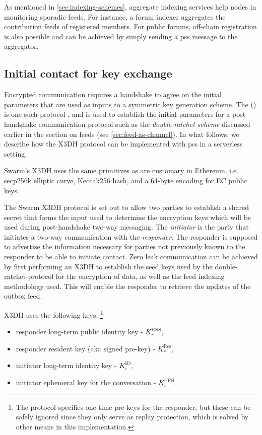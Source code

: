 As mentioned in \ref{sec:indexing-schemes}, aggregate indexing services help nodes in monitoring sporadic feeds. For instance, a forum indexer aggregates the contribution feeds of registered members. For public forums, off-chain registration is also possible and can be achieved by simply sending a pss message to the aggregator. 


\subsection{Initial contact for key exchange\statusgreen}\label{sec:pss-key-exchange}


Encrypted communication requires a handshake to agree on the initial parameters that are used as inputs to a symmetric key generation scheme. The  () is one such protocol \cite{marlinspike2016x3dh}, and is used to establish the initial parameters for a post-handshake communication protocol such as the \emph{double-ratchet scheme} discussed earlier in the section on feeds (see \ref{sec:feed-as-channel}). 
In what follows, we describe how the X3DH protocol can be implemented with pss in a serverless setting. 

Swarm's X3DH uses the same primitives as are customary in Ethereum, i.e. secp256k elliptic curve, Keccak256 hash, and a 64-byte encoding for EC public keys. 

The Swarm X3DH protocol is set out to allow two parties to establish a shared secret that forms the input used to determine the encryption keys which will be used during post-handshake two-way messaging. The \emph{initiator} is the party that initiates a two-way communication with the \emph{responder}. The responder is supposed to advertise the information necessary for parties not previously known to the responder to be able to initiate contact. Zero leak communication can be achieved by first performing an X3DH to establish the seed keys used by the double-ratchet protocol for the encryption of data, as well as the feed indexing methodology used. This will enable the responder to retrieve the updates of the outbox feed.

X3DH uses the following keys:%
%
\footnote{The protocol specifies one-time pre-keys for the responder, but these can be safely ignored since they only serve as replay protection, which is solved by other means in this implementation.}

\begin{itemize}[noitemsep]
\item responder long-term public identity key - $K^{\mathrm{ENS}}_r$,
\item responder resident key (aka signed pre-key) - $K^{\mathrm{Res}}_r$,
\item initiator long-term identity key - $K^{\mathrm{ID}}_i$,
\item initiator ephemeral key for the conversation - $K^{\mathrm{EPH}}_i$.
\end{itemize}{}




